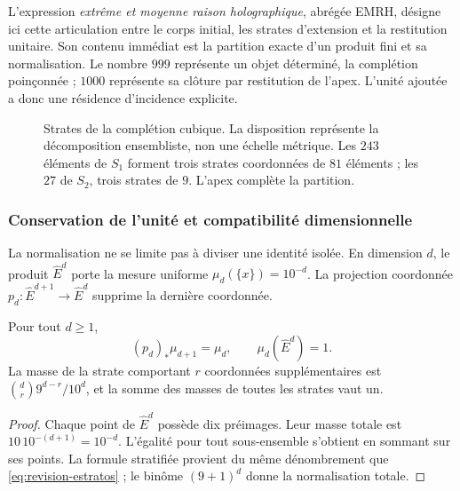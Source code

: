 L’expression \emph{extrême et moyenne raison holographique}, abrégée EMRH,
désigne ici cette articulation entre le corps initial, les
strates d’extension et la restitution unitaire. Son contenu immédiat
est la partition exacte d’un produit fini et sa normalisation. Le nombre
\(999\) représente un objet déterminé, la complétion poinçonnée ;
\(1000\) représente sa clôture par restitution de l’apex. L’unité
ajoutée a donc une résidence d’incidence explicite.

\begin{figure}[htbp]
\centering
{}
\caption{Strates de la complétion cubique. La disposition représente
la décomposition ensembliste, non une échelle métrique. Les \(243\) éléments
de \(S_1\) forment trois strates coordonnées de \(81\) éléments ; les \(27\)
de \(S_2\), trois strates de \(9\). L'apex complète la partition.}
\label{fig:revision-emrh}
\end{figure}



\subsubsection{Conservation de l'unité et compatibilité dimensionnelle}

La normalisation ne se limite pas à diviser une identité isolée. En dimension
\(d\), le produit \(\widehat E^d\) porte la mesure uniforme
\(\mu_d(\{x\})=10^{-d}\). La projection coordonnée
\(p_d:\widehat E^{d+1}\to\widehat E^d\) supprime la dernière coordonnée.

\begin{proposition}
Pour tout \(d\geq1\),
\[
 (p_d)_*\mu_{d+1}=\mu_d,
 \qquad \mu_d(\widehat E^d)=1.
\]
La masse de la strate comportant \(r\) coordonnées supplémentaires est
\(\binom dr9^{d-r}/10^d\), et la somme des masses de toutes les strates
vaut un.
\end{proposition}
\begin{proof}
Chaque point de \(\widehat E^d\) possède dix préimages. Leur masse totale est
\(10\,10^{-(d+1)}=10^{-d}\). L'égalité pour tout sous-ensemble
s'obtient en sommant sur ses points. La formule stratifiée provient
du même dénombrement que \eqref{eq:revision-estratos} ; le binôme
\((9+1)^d\) donne la normalisation totale.
\end{proof}

